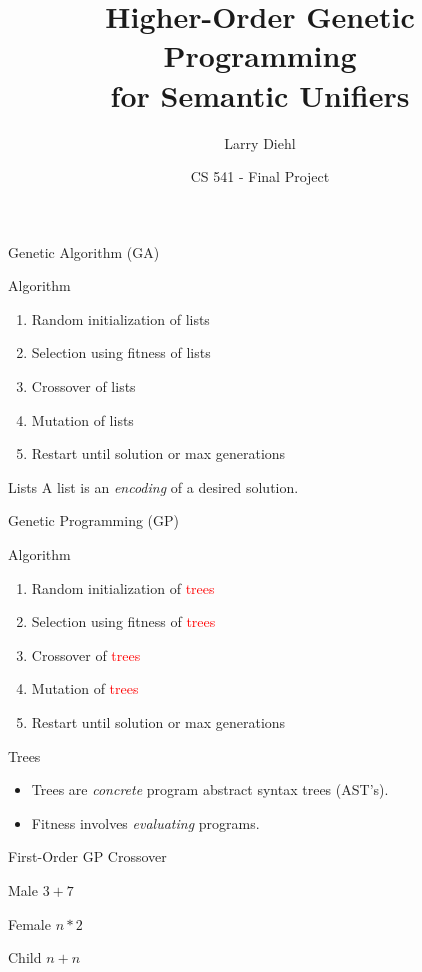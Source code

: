 \documentclass[mathserif]{beamer}
\title{Higher-Order Genetic Programming \\for Semantic Unifiers}
\author{Larry Diehl}
\institute{Portland State University}
\date[Fall 2014]
{CS 541 - Final Project}
\newcommand{\diff}[1]{\textcolor{red}{#1}}
\begin{document}
\frame{\titlepage}

\begin{frame}{Genetic Algorithm (GA)}

\begin{block}{Algorithm}
\begin{enumerate}
\item Random initialization of lists
\item Selection using fitness of lists
\item Crossover of lists
\item Mutation of lists
\item Restart until solution or max generations
\end{enumerate}
\end{block}

\begin{block}{Lists}
A list is an \textit{encoding} of a desired solution.
\end{block}

\end{frame}

\begin{frame}{Genetic Programming (GP)}

\begin{block}{Algorithm}
\begin{enumerate}
\item Random initialization of \diff{trees}
\item Selection using fitness of \diff{trees}
\item Crossover of \diff{trees}
\item Mutation of \diff{trees}
\item Restart until solution or max generations
\end{enumerate}
\end{block}

\begin{block}{Trees}
\begin{itemize}
\item Trees are \textit{concrete} program abstract syntax trees (AST's).
\item Fitness involves \textit{evaluating} programs.
\end{itemize}
\end{block}

\end{frame}

\begin{frame}{First-Order GP Crossover}

\begin{block}{Male}
$3 + 7$
\end{block}

\begin{block}{Female}
$n * 2$
\end{block}

\begin{block}{Child}
$n + n$
\end{block}

\end{frame}
\end{document}
